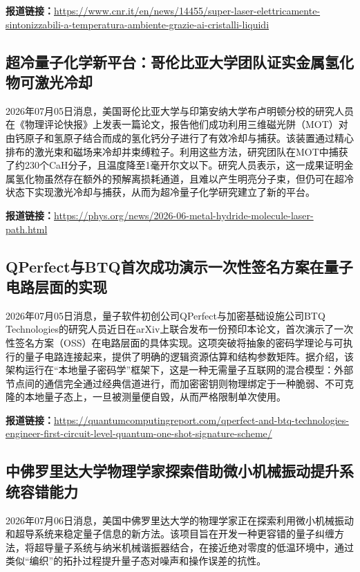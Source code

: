 \documentclass[12pt,a4paper]{ctexart}
\begin{document}
\noindent\textbf{报道链接：}\url{https://www.cnr.it/en/news/14455/super-laser-elettricamente-sintonizzabili-a-temperatura-ambiente-grazie-ai-cristalli-liquidi}

\subsection{ 超冷量子化学新平台：哥伦比亚大学团队证实金属氢化物可激光冷却 }

2026年07月05日消息，美国哥伦比亚大学与印第安纳大学布卢明顿分校的研究人员在《物理评论快报》上发表一篇论文，报告他们成功利用三维磁光阱（MOT）对由钙原子和氢原子结合而成的氢化钙分子进行了有效冷却与捕获。该装置通过精心排布的激光束和磁场来冷却并束缚粒子。利用这些方法，研究团队在MOT中捕获了约230个CaH分子，且温度降至1毫开尔文以下。研究人员表示，这一成果证明金属氢化物虽然存在额外的预解离损耗通道，且难以产生明亮分子束，但仍可在超冷状态下实现激光冷却与捕获，从而为超冷量子化学研究建立了新的平台。

\noindent\textbf{报道链接：}\url{https://phys.org/news/2026-06-metal-hydride-molecule-laser-path.html}

\subsection{ QPerfect与BTQ首次成功演示一次性签名方案在量子电路层面的实现 }

2026年07月05日消息，量子软件初创公司QPerfect与加密基础设施公司BTQ Technologies的研究人员近日在arXiv上联合发布一份预印本论文，首次演示了一次性签名方案（OSS）在电路层面的具体实现。这项突破将抽象的密码学理论与可执行的量子电路连接起来，提供了明确的逻辑资源估算和结构参数矩阵。据介绍，该架构运行在“本地量子密码学”框架下，这是一种无需量子互联网的混合模型：外部节点间的通信完全通过经典信道进行，而加密密钥则物理绑定于一种脆弱、不可克隆的本地量子态上，一旦被测量便自毁，从而严格限制单次使用。

\noindent\textbf{报道链接：}\url{https://quantumcomputingreport.com/qperfect-and-btq-technologies-engineer-first-circuit-level-quantum-one-shot-signature-scheme/}

\subsection{ 中佛罗里达大学物理学家探索借助微小机械振动提升系统容错能力 }

2026年07月06日消息，美国中佛罗里达大学的物理学家正在探索利用微小机械振动和超导系统来稳定量子信息的新方法。该项目旨在开发一种更容错的量子纠缠方法，将超导量子系统与纳米机械谐振器结合，在接近绝对零度的低温环境中，通过类似“编织”的拓扑过程提升量子态对噪声和操作误差的抗性。
\end{document}
